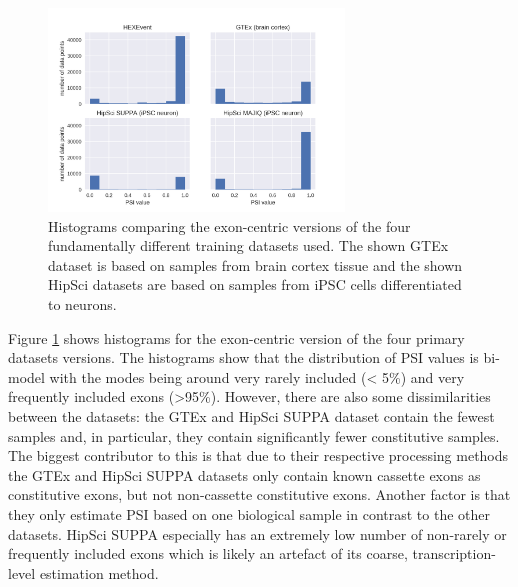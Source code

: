 \begin{figure}
	\centering\includegraphics[width=0.7\textwidth]{../visualizations/ch4-methods/dataset_histograms_seaborn.png} 
	\caption[test.]{
		Histograms comparing the exon-centric versions of the four fundamentally different training datasets used. The shown GTEx dataset is based on samples from brain cortex tissue and  the shown HipSci datasets are based on samples from iPSC cells differentiated to neurons. 
	}
	\label{fig:datahistograms}
\end{figure}

Figure \ref{fig:datahistograms} shows histograms for the exon-centric version of the four primary datasets versions. The histograms show that the distribution of PSI values is bi-model with the modes being around very rarely included (< 5\%) and very frequently included exons (>95\%). However, there are also some dissimilarities between the datasets: the GTEx and HipSci SUPPA dataset contain the fewest samples and, in particular, they contain significantly fewer constitutive samples.\\
The biggest contributor to this is that due to their respective processing methods the GTEx and HipSci SUPPA datasets only contain known cassette exons as constitutive exons, but not non-cassette constitutive exons. Another factor is that they only estimate PSI based on one biological sample in contrast to the other datasets. HipSci SUPPA especially has an extremely low number of non-rarely or frequently included exons which is likely an artefact of its coarse, transcription-level estimation method.\\

